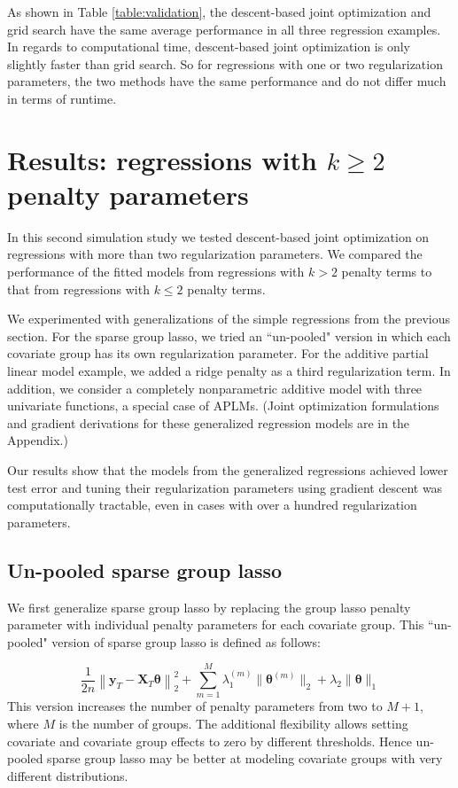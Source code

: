 \documentclass[12pt,letterpaper]{article}
\begin{document}
As shown in Table \ref{table:validation}, the descent-based joint optimization and grid search have the same average performance in all three regression examples. In regards to computational time, descent-based joint optimization is only slightly faster than grid search. So for regressions with one or two regularization parameters, the two methods have the same performance and do not differ much in terms of runtime.

\section{Results: regressions with $k\ge 2$ penalty parameters}\label{results2}

In this second simulation study we tested descent-based joint optimization on regressions with more than two regularization parameters. We compared the performance of the fitted models from regressions with $k>2$ penalty terms to that from regressions with $k \le 2$ penalty terms.

We experimented with generalizations of the simple regressions from the previous section. For the sparse group lasso, we tried an ``un-pooled" version in which each covariate group has its own regularization parameter. For the additive partial linear model example, we added a ridge penalty as a third regularization term. In addition, we consider a completely nonparametric additive model with three univariate functions, a special case of APLMs. (Joint optimization formulations and gradient derivations for these generalized regression models are in the Appendix.)

Our results show that the models from the generalized regressions achieved lower test error and tuning their regularization parameters using gradient descent was computationally tractable, even in cases with over a hundred regularization parameters.

\subsection{Un-pooled sparse group lasso}

We first generalize sparse group lasso by replacing the group lasso penalty parameter with individual penalty parameters for each covariate group. This ``un-pooled" version of sparse group lasso is defined as follows:

\begin{equation}
\frac{1}{2n} 
\left \| \boldsymbol{y}_T - \boldsymbol{X}_T \boldsymbol{\theta} \right \|^2_2
+ \sum_{m=1}^M \lambda_1^{(m)} \| \boldsymbol \theta^{(m)} \|_2
+ \lambda_2 \| \boldsymbol \theta \|_1
\label{unpooledSGL}
\end{equation}
This version increases the number of penalty parameters from two to $M+1$, where $M$ is the number of groups. The additional flexibility allows setting covariate and covariate group effects to zero by different thresholds. Hence un-pooled sparse group lasso may be better at modeling covariate groups with very different distributions.
\end{document}

